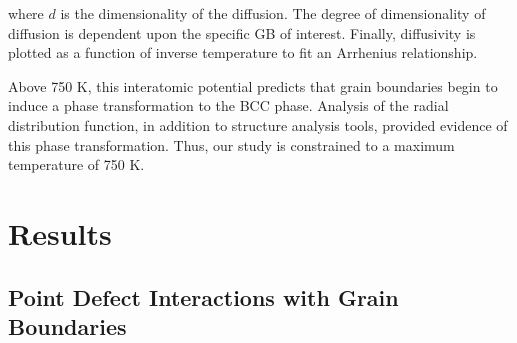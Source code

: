 \documentclass[review]{elsarticle}
\begin{document}
\noindent where $d$ is the dimensionality of the diffusion. The degree of dimensionality of diffusion is dependent upon the specific GB of interest. Finally, diffusivity is plotted as a function of inverse temperature to fit an Arrhenius relationship. 

Above 750 K, this interatomic potential predicts that grain boundaries begin to induce a phase transformation to the BCC phase. Analysis of the radial distribution function, in addition to structure analysis tools, provided evidence of this phase transformation. Thus, our study is constrained to a maximum temperature of 750 K. 




\FloatBarrier
\section{Results}

\subsection{Point Defect Interactions with Grain Boundaries}
\end{document}

